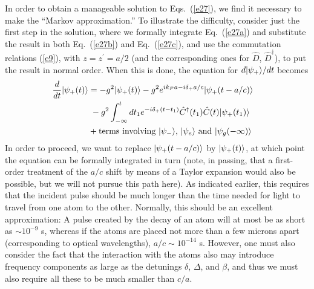 \documentclass[aps,pra,twocolumn,floatfix,superscriptaddress]{revtex4}
\begin{document}
In order to obtain a manageable solution to Eqs.~(\ref{e27}), we find it necessary to make the ``Markov approximation.'' To illustrate the difficulty, consider just the first step in the solution, where we formally integrate Eq.~(\ref{e27a}) and substitute the result in both Eq.~(\ref{e27b}) and Eq.~(\ref{e27c}), and use the commutation relations (\ref{e9}), with $z=z^\prime=a/2$ (and the corresponding ones for $\hat D$, $\hat D^\dagger$), to put the result in normal order.  When this is done, the equation for $d|\psi_+\rangle/dt$ becomes
\begin{align}
\frac{d}{dt}|\psi_{+}(t)\rangle &= -g^2|\psi_+(t)\rangle - g^2 e^{ik_Fa-i\delta_+a/c}|\psi_+(t-a/c)\rangle \cr
&\;-g^2 \int_{-\infty}^t dt_1 e^{-i\delta_+(t-t_1)}\hat C^\dagger(t_1)\hat C(t)|\psi_+(t_1)\rangle \cr
&+\text{terms involving $|\psi_-\rangle$, $|\psi_e\rangle$ and $|\psi_g(-\infty)\rangle$}
\label{e28}
\end{align}
In order to proceed, we want to replace $|\psi_+(t-a/c)\rangle$ by $|\psi_+(t)\rangle$, at which point the equation can be formally integrated in turn (note, in passing, that a first-order treatment of the $a/c$ shift by means of a Taylor expansion would also be possible, but we will not pursue this path here).  As indicated earlier, this requires that the incident pulse should be much longer than the time needed for light to travel from one atom to the other. Normally, this should be an excellent approximation: A pulse created by the decay of an atom will at most be as short as $\sim 10^{-9}$ s, whereas if the atoms are placed not more than a few microns apart (corresponding to optical wavelengths), $a/c \sim 10^{-14}$ s.  However, one must also consider the fact that the interaction with the atoms also may introduce frequency components as large as the detunings $\delta$, $\Delta$, and $\beta$, and thus we must also require all these to be much smaller than $c/a$.  
\end{document}
